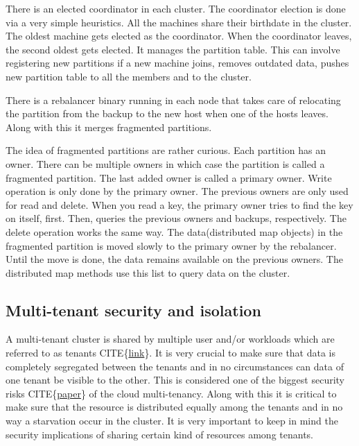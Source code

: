 \documentclass[12pt,titlepage]{article}
\begin{document}
There is an elected coordinator in each cluster. The coordinator election is
done via a very simple heuristics. All the machines share their birthdate in the
cluster. The oldest machine gets elected as the coordinator. When the
coordinator leaves, the second oldest gets elected. It manages the partition table.
This can involve registering new partitions if a new machine joins, removes
outdated data, pushes new partition table to all the members and to the cluster.

There is a rebalancer binary running in each node that takes care of relocating
the partition from the backup to the new host when one of the hosts leaves.
Along with this it merges fragmented partitions.

The idea of fragmented partitions are rather curious. Each partition has an
owner. There can be multiple owners in which case the partition is called a
fragmented partition. The last added owner is called a primary owner. Write
operation is only done by the primary owner. The previous owners are only used
for read and delete. When you read a key, the primary owner tries to find the
key on itself, first. Then, queries the previous owners and backups,
respectively. The delete operation works the same way. The data(distributed map
objects) in the fragmented partition is moved slowly to the primary owner by the
rebalancer. Until the move is done, the data remains available on the previous
owners. The distributed map methods use this list to query data on the cluster.


\subsection{Multi-tenant security and isolation}
\label{sec:org002a2e3}
A multi-tenant cluster is shared by multiple user and/or workloads which are
referred to as tenants CITE\{\href{https://cloud.google.com/kubernetes-engine/docs/concepts/multitenancy-overview}{link}\}. It is very crucial to make sure that data is
completely segregated between the tenants and in no circumstances can data of
one tenant be visible to the other. This is considered one of the biggest
security risks CITE\{\href{https://www.researchgate.net/publication/321637564\_Cloud\_Multi-Tenancy\_Issues\_and\_Developments}{paper}\} of the cloud multi-tenancy. Along with this it is
critical to make sure that the resource is distributed equally among the tenants
and in no way a starvation occur in the cluster. It is very important to keep in
mind the security implications of sharing certain kind of resources among
tenants.
\end{document}
